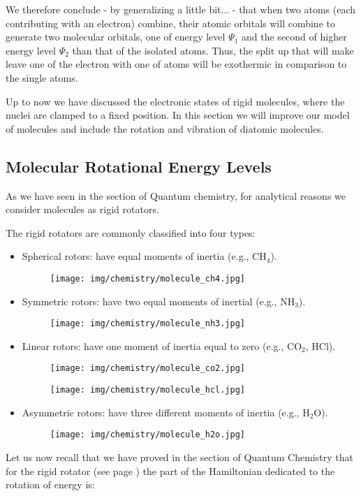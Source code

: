	We therefore conclude - by generalizing a little bit... - that when two atoms (each contributing with an electron) combine, their atomic orbitals will combine to generate two molecular orbitals, one of energy level $\Psi_1$ and the second of higher energy level $\Psi_2$ than that of the isolated atoms. Thus, the split up that will make leave one of the electron with one of atoms will be exothermic in comparison to the single atoms.
	
	Up to now we have discussed the electronic states of rigid molecules, where the nuclei are clamped to a fixed position. In this section we will improve our model of molecules and include the rotation and vibration of diatomic molecules.

	\pagebreak
	\subsection{Molecular Rotational Energy Levels}\label{molecular rotational energy levels}
	As we have seen in the section of Quantum chemistry, for analytical reasons we consider molecules as rigid rotators.

	The rigid rotators are commonly classified into four types:
	\begin{itemize}
		\item Spherical rotors: have equal moments of inertia (e.g., $\mathrm{CH}_4$).
		\begin{figure}[H]
			\centering
			\texttt{[image: img/chemistry/molecule\_ch4.jpg]}
		\end{figure}
		
		\item Symmetric rotors: have two equal moments of inertial (e.g., $\mathrm{NH}_3$).
		\begin{figure}[H]
			\centering
			\texttt{[image: img/chemistry/molecule\_nh3.jpg]}
		\end{figure}
		
		\item Linear rotors: have one moment of inertia equal to zero (e.g., $\mathrm{CO_2}$, $\mathrm{HCl}$).
		\begin{figure}[H]
			\centering
			\texttt{[image: img/chemistry/molecule\_co2.jpg]}
		\end{figure}
		\begin{figure}[H]
			\centering
			\texttt{[image: img/chemistry/molecule\_hcl.jpg]}
		\end{figure}

		\item Asymmetric rotors: have three different moments of inertia (e.g., $\mathrm{H}_2\mathrm{O}$).
		\begin{figure}[H]
			\centering
			\texttt{[image: img/chemistry/molecule\_h2o.jpg]}
		\end{figure}
	\end{itemize}
	Let us now recall that we have proved in the section of Quantum Chemistry that for the rigid rotator (see page \pageref{quantum chemistry rigid rotator}) the part of the Hamiltonian dedicated to the rotation of energy is:
	
